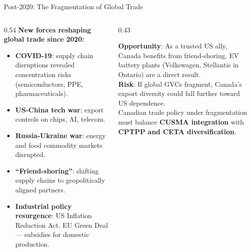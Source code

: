 \documentclass[aspectratio=169]{beamer}
\begin{document}
\begin{frame}{Post-2020: The Fragmentation of Global Trade}
\begin{columns}[T]
\begin{column}{0.54\textwidth}
\textbf{New forces reshaping global trade since 2020:}
\begin{itemize}
  \item \textbf{COVID-19}: supply chain disruptions revealed concentration risks (semiconductors, PPE, pharmaceuticals).
  \item \textbf{US-China tech war}: export controls on chips, AI, telecom.
  \item \textbf{Russia-Ukraine war}: energy and food commodity markets disrupted.
  \item \textbf{``Friend-shoring''}: shifting supply chains to geopolitically aligned partners.
  \item \textbf{Industrial policy resurgence}: US Inflation Reduction Act, EU Green Deal — subsidies for domestic production.
\end{itemize}
\end{column}
\begin{column}{0.43\textwidth}
\begin{canadex}
\footnotesize \textbf{Opportunity}: As a trusted US ally, Canada benefits from friend-shoring. EV battery plants (Volkswagen, Stellantis in Ontario) are a direct result.\\[0.3em]
\textbf{Risk}: If global GVCs fragment, Canada's export diversity could fall further toward US dependence.\\[0.3em]
Canadian trade policy under fragmentation must balance \textbf{CUSMA integration} with \textbf{CPTPP and CETA diversification}.
\end{canadex}
\end{column}
\end{columns}
\end{frame}

\end{document}
